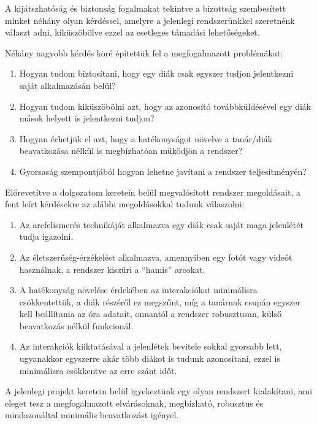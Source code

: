 A kijátszhatóság és biztonság fogalmakat tekintve a bizottság szembesített minket néhány olyan kérdéssel, amelyre a jelenlegi rendszerünkkel szeretnénk választ adni, kiküszöbölve ezzel az esetleges támadási lehetőségeket.

\newpage

Néhány nagyobb kérdés köré építettük fel a megfogalmazott problémákat:

\begin{enumerate}[label=(\alph*)]
    \item Hogyan tudom biztosítani, hogy egy diák csak egyszer tudjon jelentkezni saját alkalmazásán belül?
    \item Hogyan tudom kiküszöbölni azt, hogy az azonosító továbbküldésével egy diák mások helyett is jelentkezni tudjon?
    \item Hogyan érhetjük el azt, hogy a hatékonyságot növelve a tanár/diák beavatkozása nélkül is megbízhatóan működjön a rendszer?
    \item Gyorsaság szempontjából hogyan lehetne javítani a rendszer teljesítményén?
\end{enumerate}

Előrevetítve a dolgozatom keretein belül megvalósított rendszer megoldásait, a fent leírt kérdésekre az alábbi megoldásokkal tudunk válaszolni:

\begin{enumerate}[label=(\alph*)]
    \item Az arcfelismerés technikáját alkalmazva egy diák csak saját maga jelenlétét tudja igazolni.
    \item Az életszerűség-érzékelést alkalmazva, amennyiben egy fotót vagy videót használnak, a rendszer kiszűri a \enquote{hamis} arcokat.
    \item A hatékonyság növelése érdekében az interakciókat minimálisra csökkentettük, a diák részéről ez megszűnt, míg a tanárnak csupán egyszer kell beállítania az óra adatait, onnantól a rendszer robusztusan, külső beavatkozás nélkül funkcionál.
    \item Az interakciók kiiktatásával a jelenlétek bevitele sokkal gyorsabb lett, ugyanakkor egyszerre akár több diákot is tudunk azonosítani, ezzel is minimálisra csökkentve az erre szánt időt.
\end{enumerate}

A jelenlegi projekt keretein belül igyekeztünk egy olyan rendszert kialakítani, ami eleget tesz a megfogalmazott elvárásoknak, megbízható, robusztus és mindazonáltal minimális beavatkozást igényel. 